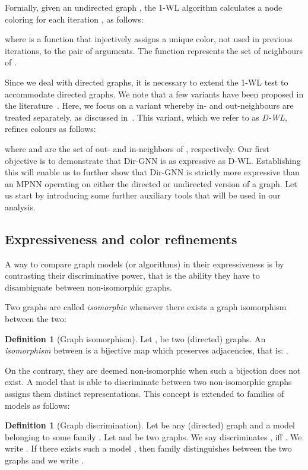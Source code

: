 \documentclass{article}
\newcommand\oursacro{Dir-GNN}
\theoremstyle{plain}
\theoremstyle{definition}
\newtheorem{definition}[theorem]{Definition}
\theoremstyle{remark}
\begin{document}
Formally, given an undirected graph , the 1-WL algorithm calculates a node coloring  for each iteration , as follows:



where  is a function that injectively assigns a unique color, not used in previous iterations, to the pair of arguments. The function  represents the set of neighbours of .

Since we deal with directed graphs, it is necessary to extend the 1-WL test to accommodate directed graphs. We note that a few variants have been proposed in the literature~\cite{Grohe2021ColorRA,DBLP:journals/corr/abs-1904-08745,Kollias2022DirectedGA}. Here, we focus on a variant whereby in- and out-neighbours are treated separately, as discussed in~\citep{Grohe2021ColorRA}. This variant, which we refer to as \textit{D-WL}, refines colours as follows:



where  and  are the set of out- and in-neighbors of , respectively. Our first objective is to demonstrate that \oursacro{} is as expressive as D-WL. Establishing this will enable us to further show that \oursacro{} is strictly more expressive than an MPNN operating on either the directed or undirected version of a graph. Let us start by introducing some further auxiliary tools that will be used in our analysis.

\subsection{Expressiveness and color refinements}

A way to compare graph models (or algorithms) in their expressiveness is by contrasting their discriminative power, that is the ability they have to disambiguate between non-isomorphic graphs.

Two graphs are called \emph{isomorphic} whenever there exists a graph isomorphism between the two:
\begin{definition}[Graph isomorphism]\label{def:isomorphism}
    Let ,  be two (directed) graphs. An \emph{isomorphism} between  is a bijective map  which preserves adjacencies, that is: . 
\end{definition}
\noindent On the contrary, they are deemed non-isomorphic when such a bijection does not exist. A model that is able to discriminate between two non-isomorphic graphs assigns them distinct representations. This concept is extended to families of models as follows:
\begin{definition}[Graph discrimination]
    Let  be any (directed) graph and  a model belonging to some family . 
    Let  and  be two graphs. We say  discriminates ,  iff . 
    We write . If there exists such a model , then family  distinguishes between the two graphs and we write . 
\end{definition}
\end{document}
